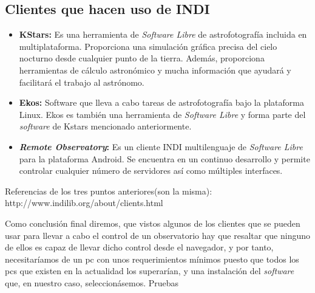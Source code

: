 \subsection{Clientes que hacen uso de INDI}
\begin{itemize}
  \item \textbf{KStars:} Es una herramienta de \textit{Software Libre} de astrofotografía incluida en multiplataforma. Proporciona una simulación gráfica precisa del cielo nocturno desde cualquier punto de la tierra. Además, proporciona herramientas de cálculo astronómico y mucha información que ayudará y facilitará el trabajo  al astrónomo.
  \item \textbf{Ekos:} Software que lleva a cabo tareas de astrofotografía bajo la plataforma Linux. Ekos es también una herramienta de \textit{Software Libre} y forma parte del \textit{software} de Kstars mencionado anteriormente.
  \item \textbf{\textit{Remote Observatory}:} Es un cliente INDI multilenguaje de \textit{Software Libre} para la plataforma Android. Se encuentra en un continuo desarrollo y permite controlar cualquier número de servidores así como múltiples interfaces.
\end{itemize}
Referencias de los tres puntos anteriores(son la misma):
http://www.indilib.org/about/clients.html

Como conclusión final diremos, que vistos algunos de los clientes que se pueden usar para llevar a cabo el control de un observatorio hay que resaltar que ninguno de ellos es capaz de llevar dicho control desde el navegador, y por tanto, necesitaríamos de un pc con unos requerimientos mínimos puesto que todos los pcs que existen en la actualidad los superarían, y una instalación del \textit{software} que, en nuestro caso, seleccionásemos.
Pruebas
